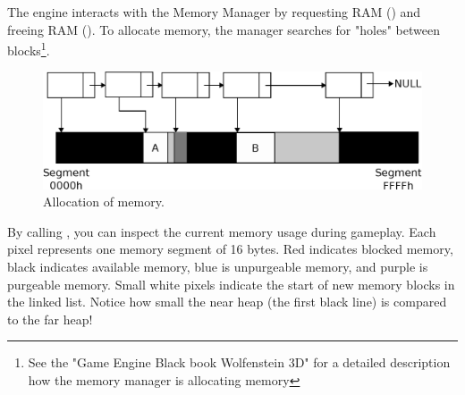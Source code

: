 \documentclass[book.tex]{subfiles}
\begin{document}
\par
The engine interacts with the Memory Manager by requesting RAM () and freeing RAM (). To allocate memory, the manager searches for "holes" between
blocks\footnote{See the "Game Engine Black book Wolfenstein 3D" for a detailed description how the memory manager is allocating memory}. \\
\begin{figure}[H]
\centering
 \includegraphics[width=\textwidth]{imgs/drawings/mm_allocation.eps}
 \caption{Allocation of memory.}
 \end{figure}
 \par

\par
By calling , you can inspect the current memory usage during gameplay. Each pixel represents one memory segment of 16 bytes. Red indicates blocked memory, black indicates available memory, blue is unpurgeable memory, and purple is purgeable memory. Small white pixels indicate the start of new memory blocks in the linked list. Notice how small the near heap (the first black line) is compared to the far heap!\\
\end{document}
